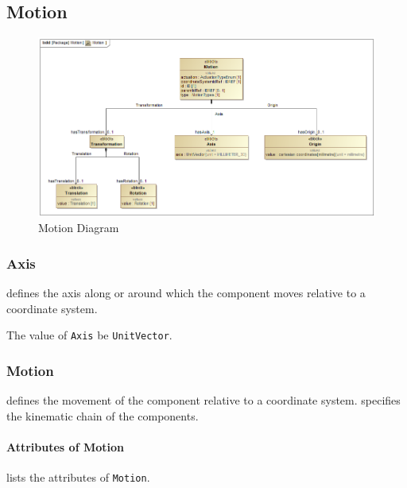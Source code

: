 \subsection{Motion} \label{sec:Motion}


\begin{figure}[ht]
  \centering
    \includegraphics[width=1.0\textwidth]{figures/Motion.png}
  \caption{Motion Diagram}
  \label{fig:Motion}
\end{figure}

\FloatBarrier



\subsubsection{Axis}




 defines the axis along or around which the component moves relative to a coordinate system.


The value of \texttt{Axis} \MUST be \texttt{UnitVector}.


\subsubsection{Motion}
\label{sec:Motion}



 defines the movement of the component relative to a coordinate system.  specifies the kinematic chain of the components.


\paragraph{Attributes of Motion}\mbox{}
\label{sec:Attributes of Motion}

 lists the attributes of \texttt{Motion}.

